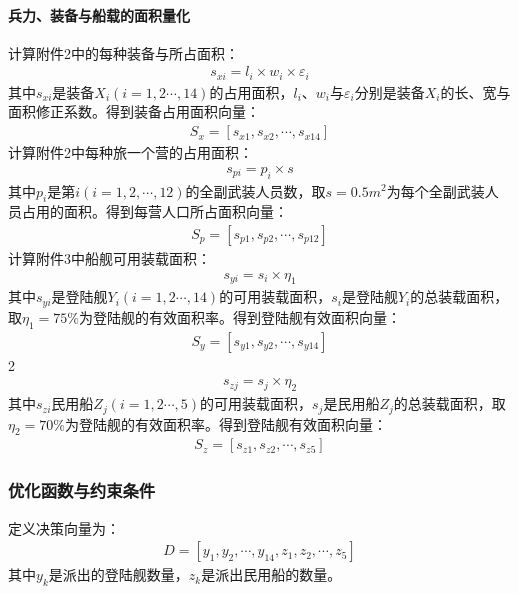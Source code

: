\documentclass{whutmod}
\begin{document}
	    \paragraph{兵力、装备与船载的面积量化}
	    计算附件2中的每种装备与所占面积：
	    \begin{gather}
	    s_{xi}=l_{i}\times w_{i} \times \varepsilon _{i}
	    \end{gather}
	    其中$s_{xi}$是装备$X_{i}(i=1,2\cdots,14)$的占用面积，$l_{i}$、$w_{i}$与$\varepsilon _{i}$分别是装备$X_{i}$的长、宽与面积修正系数。得到装备占用面积向量：
	     \begin{gather}
	     S_{x}=[s_{x1},s_{x2},\cdots,s_{x14}]
	     \end{gather}
	     计算附件2中每种旅一个营的占用面积：
	     \begin{gather}
	     s_{pi}=p_{i}\times s
	     \end{gather}
	     其中$p_{i}$是第$i(i=1,2,\cdots,12)$的全副武装人员数，取$s=0.5m^2$为每个全副武装人员占用的面积。得到每营人口所占面积向量：
	     \begin{gather}
	     S_{p}=[s_{p1},s_{p2},\cdots,s_{p12}]
	     \end{gather}
	     计算附件3中船舰可用装载面积：
	      \begin{gather}
	      s_{yi}=s_{i}\times \eta_{1}
	      \end{gather}
	    其中$s_{yi}$是登陆舰$Y_{i}(i=1,2\cdots,14)$的可用装载面积，$s_{i}$是登陆舰$Y_{i}$的总装载面积，取$\eta_{1}=75\%$为登陆舰的有效面积率。得到登陆舰有效面积向量：
	     \begin{gather}
	     S_{y}=[s_{y1},s_{y2},\cdots,s_{y14}]
	      \end{gather}
2	      \begin{gather}
	      s_{zj}=s_{j}\times \eta_{2}
	      \end{gather}
	       其中$s_{zi}$民用船$Z_{j}(i=1,2\cdots,5)$的可用装载面积，$s_{j}$是民用船$Z_{j}$的总装载面积，取$\eta_{2}=70\%$为登陆舰的有效面积率。得到登陆舰有效面积向量：
	       \begin{gather}
	       S_{z}=[s_{z1},s_{z2},\cdots,s_{z5}]
	      \end{gather}

	    \subsubsection{优化函数与约束条件}
	    定义决策向量为：
	     \begin{gather}
	     D=[y_{1},y_{2},\cdots,y_{14},z_{1},z_{2},\cdots,z_{5}]
	    \end{gather}
	    其中$y_{k}$是派出的登陆舰数量，$z_{k}$是派出民用船的数量。
	    
\end{document}
